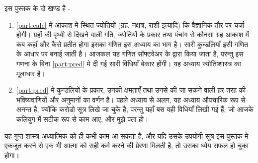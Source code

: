 इस पुस्तक के दो खण्ड है -
\begin{enumerate}
\item \autoref{part:calc} में आकाश में स्थित ज्योतियों (ग्रह, नक्षत्र, राशी इत्यादि) कि वैज्ञानिक तौर पर चर्चा होगी।  ग्रहों की पृथ्वी से दिखने वाली गति, ज्योतियों के प्रकार तथा पंचांग से कौनसा ग्रह आकाश में कब कहाँ और कैसे प्रतीत होगा इसका गणित इस अध्याय का भाग है। सारी कुन्डलियाँ इसी गणित के आधार पर बनाई जाती है। आजकल यह गणित  सॉफ्टवेअर के द्वारा किया जाता है, परन्तु  इस गणना के बिना \autoref{part:pred} मे दी गई सारी विधियाँ बेकार होंगी। यह अध्याय ज्योतिष्शास्त्र का मूलाधार है।
\item \autoref{part:pred} में कुन्डलियों के प्रकार, उनकी क्षमताएँ तथा उनसे की जा सकने वाली हर तरह की भविष्यवाणियों और अनुमानों का वर्णन है। पहले अध्याय से अलग,  यह अध्याय औपचारिक रूप से अनन्त है, क्योंकि करोडो सूत्र लिखे जा चुके है, परन्तु यहाँ बस वही विधियाँ लिखी गई हैं, जो आजके कलियुग में सटीक रूप से काम आए, और मुझे पता हो। 
\end{enumerate}
यह गुप्त शास्त्र अध्यात्मिक को ही कभी काम आ सकता है, और यदि उसके उपयोगी सूत्र इस पुस्तक मे एकजुत करने से एक  भी आत्मा को  सही कर्म करने की प्रेरणा मिलती है, तो उसका ध्येय सफल हो चुका होगा।